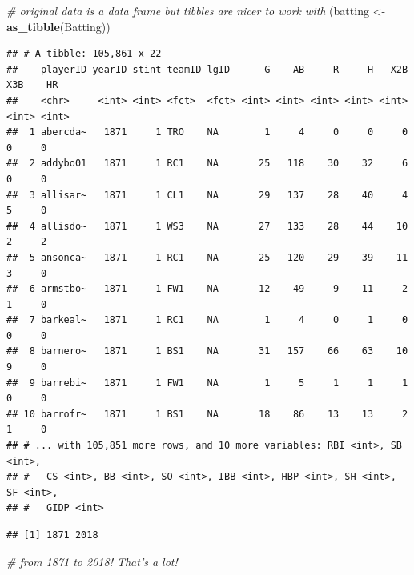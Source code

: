 \documentclass[
]{article}
\newenvironment{Shaded}{\begin{snugshade}}{\end{snugshade}}
\newcommand{\CommentTok}[1]{\textcolor[rgb]{0.56,0.35,0.01}{\textit{#1}}}
\newcommand{\KeywordTok}[1]{\textcolor[rgb]{0.13,0.29,0.53}{\textbf{#1}}}
\newcommand{\NormalTok}[1]{#1}
\newcommand{\OperatorTok}[1]{\textcolor[rgb]{0.81,0.36,0.00}{\textbf{#1}}}
\newcommand{\StringTok}[1]{\textcolor[rgb]{0.31,0.60,0.02}{#1}}
\begin{document}
\begin{Shaded}
\begin{Highlighting}[]
\CommentTok{# original data is a data frame but tibbles are nicer to work with}
\NormalTok{(batting <-}\StringTok{ }\KeywordTok{as_tibble}\NormalTok{(Batting))}
\end{Highlighting}
\end{Shaded}

\begin{verbatim}
## # A tibble: 105,861 x 22
##    playerID yearID stint teamID lgID      G    AB     R     H   X2B   X3B    HR
##    <chr>     <int> <int> <fct>  <fct> <int> <int> <int> <int> <int> <int> <int>
##  1 abercda~   1871     1 TRO    NA        1     4     0     0     0     0     0
##  2 addybo01   1871     1 RC1    NA       25   118    30    32     6     0     0
##  3 allisar~   1871     1 CL1    NA       29   137    28    40     4     5     0
##  4 allisdo~   1871     1 WS3    NA       27   133    28    44    10     2     2
##  5 ansonca~   1871     1 RC1    NA       25   120    29    39    11     3     0
##  6 armstbo~   1871     1 FW1    NA       12    49     9    11     2     1     0
##  7 barkeal~   1871     1 RC1    NA        1     4     0     1     0     0     0
##  8 barnero~   1871     1 BS1    NA       31   157    66    63    10     9     0
##  9 barrebi~   1871     1 FW1    NA        1     5     1     1     1     0     0
## 10 barrofr~   1871     1 BS1    NA       18    86    13    13     2     1     0
## # ... with 105,851 more rows, and 10 more variables: RBI <int>, SB <int>,
## #   CS <int>, BB <int>, SO <int>, IBB <int>, HBP <int>, SH <int>, SF <int>,
## #   GIDP <int>
\end{verbatim}

\begin{Shaded}
\end{Shaded}

\begin{verbatim}
## [1] 1871 2018
\end{verbatim}

\begin{Shaded}
\begin{Highlighting}[]
\CommentTok{# from 1871 to 2018! That's a lot! }
\end{Highlighting}
\end{Shaded}
\end{document}

